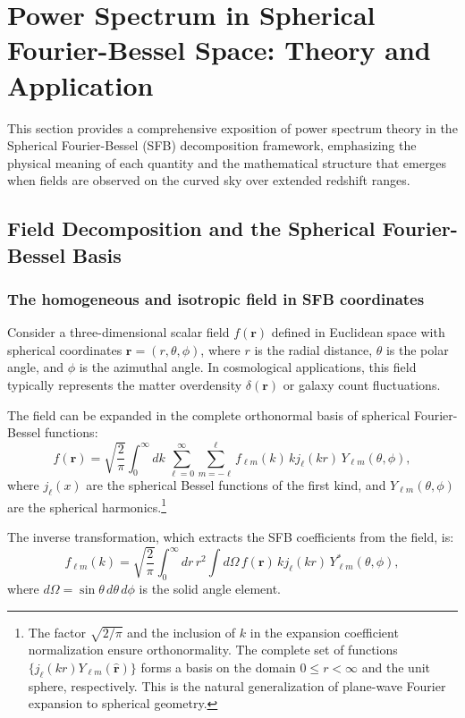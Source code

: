 \section{Power Spectrum in Spherical Fourier-Bessel Space: Theory and Application}

This section provides a comprehensive exposition of power spectrum theory in the Spherical Fourier-Bessel (SFB)
decomposition framework, emphasizing the physical meaning of each quantity and the mathematical structure that
emerges when fields are observed on the curved sky over extended redshift ranges.

\subsection{Field Decomposition and the Spherical Fourier-Bessel Basis}

\subsubsection{The homogeneous and isotropic field in SFB coordinates}

Consider a three-dimensional scalar field $f(\mathbf{r})$ defined in Euclidean space with spherical coordinates
$\mathbf{r}=(r,\theta,\phi)$, where $r$ is the radial distance, $\theta$ is the polar angle, and $\phi$ is the azimuthal angle.
In cosmological applications, this field typically represents the matter overdensity $\delta(\mathbf{r})$ or galaxy count
fluctuations.

The field can be expanded in the complete orthonormal basis of spherical Fourier-Bessel functions:
\begin{equation}
f(\mathbf{r}) = \sqrt{\frac{2}{\pi}}
\int_0^\infty dk\,
\sum_{\ell=0}^\infty\sum_{m=-\ell}^{\ell}
f_{\ell m}(k)\,k j_\ell(kr)\,Y_{\ell m}(\theta,\phi),
\label{eq:sfb_expansion}
\end{equation}
where $j_\ell(x)$ are the spherical Bessel functions of the first kind, and $Y_{\ell m}(\theta,\phi)$ are the spherical
harmonics.\footnote{The factor $\sqrt{2/\pi}$ and the inclusion of $k$ in the expansion coefficient normalization
ensure orthonormality. The complete set of functions $\{j_\ell(kr)Y_{\ell m}(\hat{\mathbf{r}})\}$ forms a basis on
the domain $0\le r<\infty$ and the unit sphere, respectively. This is the natural generalization of plane-wave
Fourier expansion to spherical geometry.}

The inverse transformation, which extracts the SFB coefficients from the field, is:
\begin{equation}
f_{\ell m}(k) = \sqrt{\frac{2}{\pi}}
\int_0^\infty dr\,r^2
\int d\Omega\,
f(\mathbf{r})\,k j_\ell(kr)\,Y^*_{\ell m}(\theta,\phi),
\label{eq:sfb_inverse}
\end{equation}
where $d\Omega = \sin\theta\,d\theta\,d\phi$ is the solid angle element.

